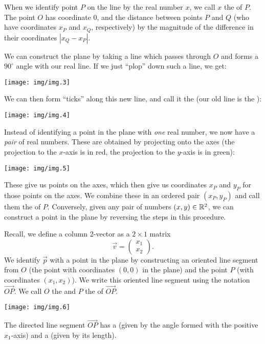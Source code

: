 When we identify point $P$ on the line by the real number $x$, we call
$x$ the  of $P$. The point $O$ has coordinate $0$,
and the distance between points $P$ and $Q$ (who have coordinates
$x_{P}$ and $x_{Q}$, respectively) by the magnitude of the difference in
their coordinates $|x_{Q}-x_{P}|$.

We can construct the plane by taking a line which passes through $O$ and
forms a $90^{\circ}$ angle with our real line. If we just ``plop'' down
such a line, we get:
\begin{center}
\texttt{[image: img/img.3]}
\end{center}
We can then form ``ticks'' along this new line, and call it the
 (our old line is the ):
\begin{center}
\texttt{[image: img/img.4]}
\end{center}
Instead of identifying a point in the plane with \emph{one} real number,
we now have a \emph{pair} of real numbers. These are obtained by
projecting onto the axes (the projection to the $x$-axis is in red, the
projection to the $y$-axis is in green):
\begin{center}
\texttt{[image: img/img.5]}
\end{center}
These give us points on the axes, which then give us coordinates $x_{P}$
and $y_{P}$ for those points on the axes. We combine these in an ordered
pair $(x_{P}, y_{P})$ and call them the  of $P$.
Conversely, given any pair of numbers $(x,y)\in\mathbb{R}^{2}$, we can
construct a point in the plane by reversing the steps in this procedure.

Recall, we define a column 2-vector as a $2\times1$ matrix
\begin{equation}
\vec{v} = \begin{pmatrix}x_{1}\\x_{2}
\end{pmatrix}.
\end{equation}
We identify $\vec{p}$ with a point in the plane by constructing an
oriented line segment from $O$ (the point with coordinates $(0,0)$ in
the plane) and the point $P$ (with coordinates $(x_{1},x_{2})$). We
write this oriented line segment using the notation
$\overrightarrow{OP}$. We call $O$ the  and $P$ the
 of $\overrightarrow{OP}$.
\begin{center}
\texttt{[image: img/img.6]}
\end{center}
The directed line segment $\overrightarrow{OP}$ has a  (given
by the angle formed with the positive $x_{1}$-axis) and a
 (given by its length).


